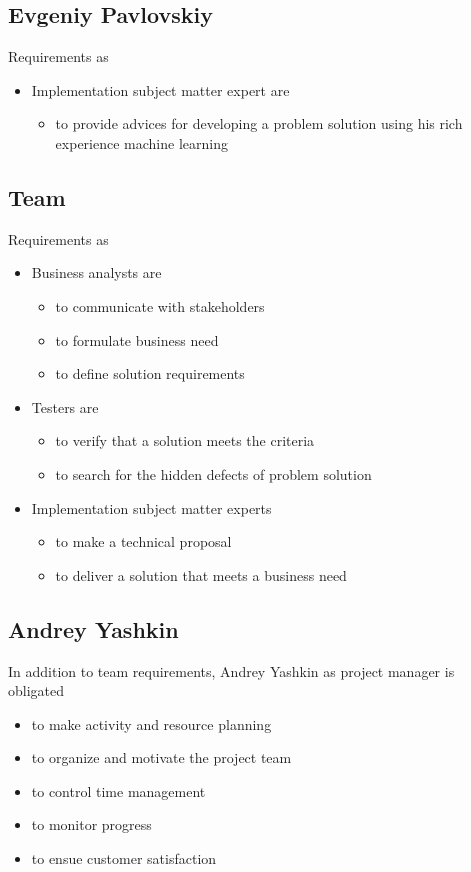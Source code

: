 \subsection{Evgeniy Pavlovskiy}

Requirements as
\begin{itemize}
	\item Implementation subject matter expert are
	\begin{itemize}
		\item to provide advices for developing a problem solution using his rich experience machine learning
	\end{itemize}
\end{itemize}


\subsection{Team}
Requirements as
\begin{itemize}
	\item Business analysts are
	\begin{itemize}
		\item to communicate with stakeholders
		\item to formulate business need
		\item to define solution requirements
	\end{itemize}
	\item Testers are
	\begin{itemize}
		\item to verify that a solution meets the criteria
		\item to search for the hidden defects of problem solution
	\end{itemize}
	\item Implementation subject matter experts
	\begin{itemize}
		\item to make a technical proposal
		\item to deliver a solution that meets a business need
	\end{itemize}
\end{itemize}

\subsection{Andrey Yashkin}
In addition to team requirements, Andrey Yashkin as project manager is obligated 
\begin{itemize}
	\item to make activity and resource planning
	\item to organize and motivate the project team
	\item to control time management
	\item to monitor progress
	\item to ensue customer satisfaction
\end{itemize}